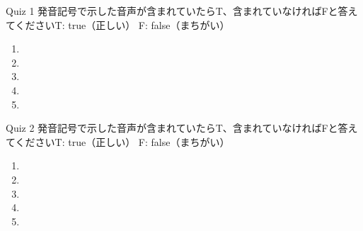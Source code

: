 \documentclass[aspectratio=169,xcolor={dvipsnames,table}]{beamer}
\begin{document}
\begin{frame}[plain]{Quiz 1 }
\large
発音記号で示した音声が含まれていたらT、含まれていなければFと答えてください\hfill{}{\scriptsize T: true（正しい）\hspace{5pt} F: false（まちがい）}
 \begin{enumerate}
  \item \mbox{}\hspace{1\zw}
  \item \mbox{}\visible<3->{T}\hspace{1\zw}
  \item \mbox{}\hspace{1\zw}
  \item \mbox{}\hspace{1\zw}
  \item \mbox{}\hspace{1\zw}
 \end{enumerate}

\hfill{}

\end{frame}
\begin{frame}[plain]{Quiz 2 }
\large
発音記号で示した音声が含まれていたらT、含まれていなければFと答えてください\hfill{}{\scriptsize T: true（正しい）\hspace{5pt} F: false（まちがい）}
 \begin{enumerate}
  \item \mbox{}\visible<2->{F}\hspace{1\zw}
  \item \mbox{}\hspace{1\zw}
  \item \mbox{}\visible<4->{T}\hspace{1\zw}
  \item \mbox{}\hspace{1\zw}
  \item \mbox{}\hspace{1\zw}
 \end{enumerate}

\hfill{}


\end{frame}
\end{document}
